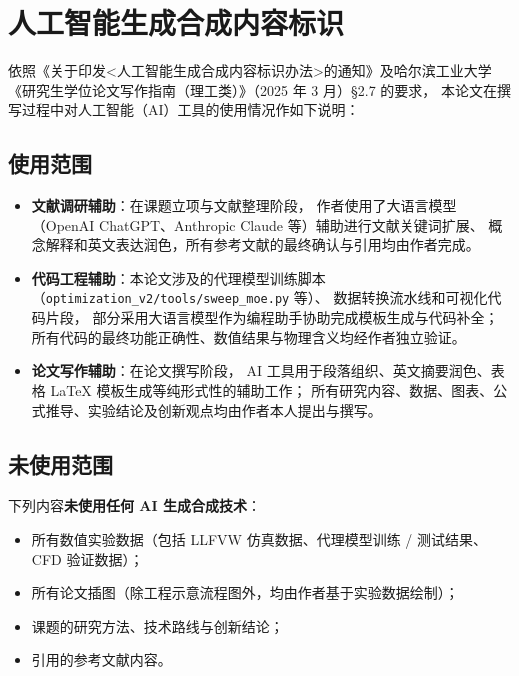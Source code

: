 
\chapter*{人工智能生成合成内容标识}

依照《关于印发\textless 人工智能生成合成内容标识办法\textgreater 的通知》及哈尔滨工业大学《研究生学位论文写作指南（理工类）》（2025 年 3 月）\S 2.7 的要求，
本论文在撰写过程中对人工智能（AI）工具的使用情况作如下说明：

\section*{使用范围}

\begin{itemize}
  \item \textbf{文献调研辅助}：在课题立项与文献整理阶段，
        作者使用了大语言模型（OpenAI ChatGPT、Anthropic Claude 等）辅助进行文献关键词扩展、
        概念解释和英文表达润色，所有参考文献的最终确认与引用均由作者完成。

  \item \textbf{代码工程辅助}：本论文涉及的代理模型训练脚本
        （\texttt{optimization\_v2/tools/sweep\_moe.py} 等）、
        数据转换流水线和可视化代码片段，
        部分采用大语言模型作为编程助手协助完成模板生成与代码补全；
        所有代码的最终功能正确性、数值结果与物理含义均经作者独立验证。

  \item \textbf{论文写作辅助}：在论文撰写阶段，
        AI 工具用于段落组织、英文摘要润色、表格 LaTeX 模板生成等纯形式性的辅助工作；
        所有研究内容、数据、图表、公式推导、实验结论及创新观点均由作者本人提出与撰写。
\end{itemize}

\section*{未使用范围}

下列内容\textbf{未使用任何 AI 生成合成技术}：
\begin{itemize}
  \item 所有数值实验数据（包括 LLFVW 仿真数据、代理模型训练 / 测试结果、CFD 验证数据）；
  \item 所有论文插图（除工程示意流程图外，均由作者基于实验数据绘制）；
  \item 课题的研究方法、技术路线与创新结论；
  \item 引用的参考文献内容。
\end{itemize}

